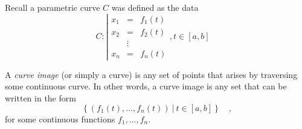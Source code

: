 
\begin{frame}
Recall a parametric curve $C$  was defined as the data
\[
C:
\left| 
\begin{array}{rcl}
x_1&=&f_1(t)\\
x_2&=&f_2(t)\\
&\vdots & \\
x_n&=&f_n(t)
\end{array} \right., t\in [a,b]\quad 
\]
\begin{definition}
A \emph{curve image} (or simply a curve) is any set of points that arises by traversing some \alert<handout:2|2>{continuous} curve. In other words, a curve image is any set that can be written in the form
\[
\left\{(f_1(t),\dots, f_n(t))~|~ t\in [a,b]\right\}\quad ,
\]
for some \alert<handout:2|2>{continuous} functions $f_1, \dots, f_n$.
\end{definition}

\end{frame}